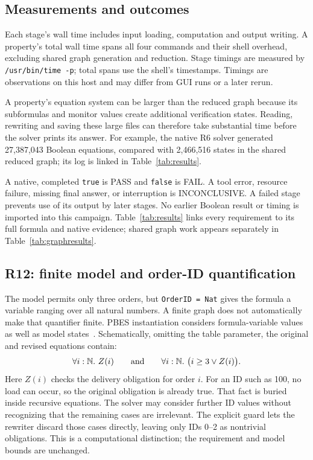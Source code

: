 \documentclass[11pt,a4paper]{article}
\begin{document}
\subsection{Measurements and outcomes}
Each stage's wall time includes input loading, computation and output writing. A property's total wall time spans all four commands and their shell overhead, excluding shared graph generation and reduction. Stage timings are measured by \texttt{/usr/bin/time -p}; total spans use the shell's timestamps. Timings are observations on this host and may differ from GUI runs or a later rerun.

A property's equation system can be larger than the reduced graph because its subformulas and monitor values create additional verification states. Reading, rewriting and saving these large files can therefore take substantial time before the solver prints its answer.
For example, the native R6 solver generated 27,387,043 Boolean equations, compared with 2,466,516 states in the shared reduced graph; its log is linked in Table~\ref{tab:results}.

A native, completed \texttt{true} is PASS and \texttt{false} is FAIL. A tool error, resource failure, missing final answer, or interruption is INCONCLUSIVE. A failed stage prevents use of its output by later stages. No earlier Boolean result or timing is imported into this campaign. Table~\ref{tab:results} links every requirement to its full formula and native evidence; shared graph work appears separately in Table~\ref{tab:graphresults}.



\Needspace{350pt}
\subsection{R12: finite model and order-ID quantification}
\label{sec:r12quantification}
The model permits only three orders, but \texttt{OrderID = Nat} gives the formula a variable ranging over all natural numbers. A finite graph does not automatically make that quantifier finite. PBES instantiation considers formula-variable values as well as model states~\cite{pbessolve}. Schematically, omitting the table parameter, the original and revised equations contain:
\[
  \forall i : \mathbb{N}.\ Z(i)
  \qquad\hbox{and}\qquad
  \forall i : \mathbb{N}.\ \bigl(i \geq 3 \lor Z(i)\bigr).
\]
Here $Z(i)$ checks the delivery obligation for order $i$. For an ID such as 100, no load can occur, so the original obligation is already true. That fact is buried inside recursive equations. The solver may consider further ID values without recognizing that the remaining cases are irrelevant. The explicit guard lets the rewriter discard those cases directly, leaving only IDs 0--2 as nontrivial obligations. This is a computational distinction; the requirement and model bounds are unchanged.
\end{document}
